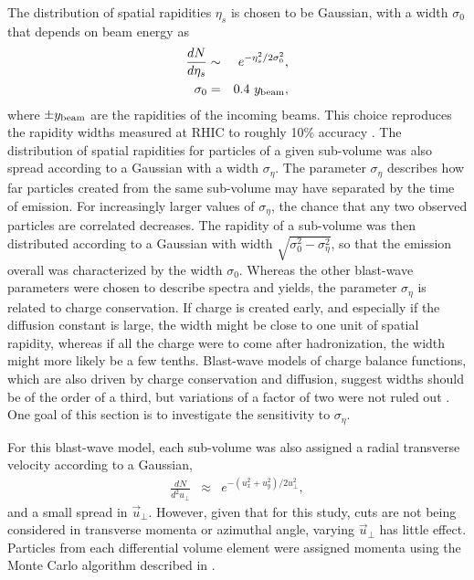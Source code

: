 The distribution of spatial rapidities $\eta_s$ is chosen to be Gaussian, with a width $\sigma_0$ that depends on beam energy as
\begin{eqnarray}
\frac{dN}{d\eta_s}&\sim& e^{-\eta_s^2/2\sigma_0^2},\\
\nonumber
\sigma_0&=&0.4~y_{\rm beam},
\end{eqnarray}
where $\pm y_{\rm beam}$ are the rapidities of the incoming beams. This choice reproduces the rapidity widths measured at RHIC to roughly 10\% accuracy \cite{Flores:2016mtp}. The distribution of spatial rapidities for particles of a given sub-volume was also spread according to a Gaussian with a width $\sigma_\eta$. The parameter $\sigma_\eta$ describes how far particles created from the same sub-volume may have separated by the time of emission. For increasingly larger values of $\sigma_\eta$, the chance that any two observed particles are correlated decreases. The rapidity of a sub-volume was then distributed according to a Gaussian with width $\sqrt{\sigma_0^2-\sigma_\eta^2}$, so that the emission overall was characterized by the width $\sigma_0$. Whereas the other blast-wave parameters were chosen to describe spectra and yields, the parameter $\sigma_\eta$ is related to charge conservation. If charge is created early, and especially if the diffusion constant is large, the width might be close to one unit of spatial rapidity, whereas if all the charge were to come after hadronization, the width might more likely be a few tenths. Blast-wave models of charge balance functions, which are also driven by charge conservation and diffusion, suggest widths should be of the order of a third, but variations of a factor of two were not ruled out \cite{Schlichting:2010qia}. One goal of this section is to investigate the sensitivity to $\sigma_\eta$.

For this blast-wave model, each sub-volume was also assigned a radial transverse velocity according to a Gaussian,
\begin{eqnarray}
\frac{dN}{d^2u_\perp}&\approx&e^{-(u_x^2+u_y^2)/2u_\perp^2},
\end{eqnarray}
and a small spread in $\vec{u}_\perp$. However, given that for this study, cuts are not being considered in transverse momenta or azimuthal angle, varying $\vec{u}_\perp$ has little effect. Particles from each differential volume element were assigned momenta using the Monte Carlo algorithm described in \cite{Pratt:2010jt}.

